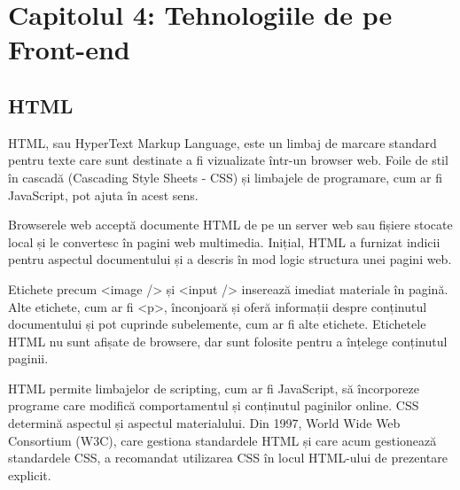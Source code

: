\chapter{Capitolul 4: Tehnologiile de pe Front-end}
\label{chap:ch3}

\section{HTML}
\label{sec:ch4sec2}
\par HTML, sau HyperText Markup Language, este un limbaj de marcare standard pentru texte care sunt destinate a fi vizualizate într-un browser web. Foile de stil în cascadă (Cascading Style Sheets - CSS) și limbajele de programare, cum ar fi JavaScript, pot ajuta în acest sens.
\par Browserele web acceptă documente HTML de pe un server web sau fișiere stocate local și le convertesc în pagini web multimedia. Inițial, HTML a furnizat indicii pentru aspectul documentului și a descris în mod logic structura unei pagini web.
\par Etichete precum <image /> și <input /> inserează imediat materiale în pagină. Alte etichete, cum ar fi <p>, înconjoară și oferă informații despre conținutul documentului și pot cuprinde subelemente, cum ar fi alte etichete. Etichetele HTML nu sunt afișate de browsere, dar sunt folosite pentru a înțelege conținutul paginii.
\par HTML permite limbajelor de scripting, cum ar fi JavaScript, să încorporeze programe care modifică comportamentul și conținutul paginilor online. CSS determină aspectul și aspectul materialului. Din 1997, World Wide Web Consortium (W3C), care gestiona standardele HTML și care acum gestionează standardele CSS, a recomandat utilizarea CSS în locul HTML-ului de prezentare explicit.

